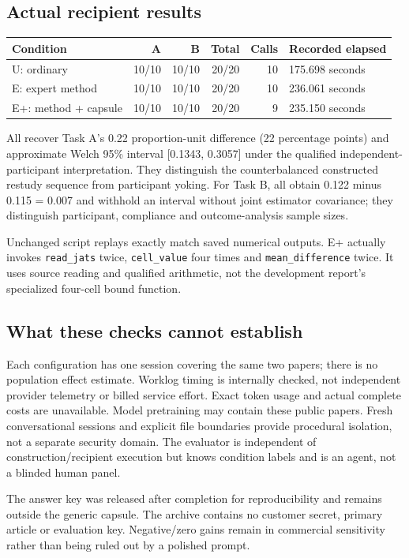 \documentclass[10pt]{article}
\begin{document}
\subsection*{Actual recipient results}

\begin{tabularx}{\textwidth}{lrrrrY}
\toprule Condition & A & B & Total & Calls & Recorded elapsed\\\midrule
U: ordinary &10/10 &10/10 &20/20 &10 &175.698 seconds\\
E: expert method &10/10 &10/10 &20/20 &10 &236.061 seconds\\
E+: method + capsule &10/10 &10/10 &20/20 &9 &235.150 seconds\\\bottomrule
\end{tabularx}

All recover Task A's 0.22 proportion-unit difference (22 percentage points) and approximate Welch 95\% interval [0.1343, 0.3057] under the qualified independent-participant interpretation. They distinguish the counterbalanced constructed restudy sequence from participant yoking. For Task B, all obtain 0.122 minus 0.115 = 0.007 and withhold an interval without joint estimator covariance; they distinguish participant, compliance and outcome-analysis sample sizes.

Unchanged script replays exactly match saved numerical outputs. E+ actually invokes \texttt{read\_jats} twice, \texttt{cell\_value} four times and \texttt{mean\_difference} twice. It uses source reading and qualified arithmetic, not the development report's specialized four-cell bound function.

\subsection*{What these checks cannot establish}

Each configuration has one session covering the same two papers; there is no population effect estimate. Worklog timing is internally checked, not independent provider telemetry or billed service effort. Exact token usage and actual complete costs are unavailable. Model pretraining may contain these public papers. Fresh conversational sessions and explicit file boundaries provide procedural isolation, not a separate security domain. The evaluator is independent of construction/recipient execution but knows condition labels and is an agent, not a blinded human panel.

The answer key was released after completion for reproducibility and remains outside the generic capsule. The archive contains no customer secret, primary article or evaluation key. Negative/zero gains remain in commercial sensitivity rather than being ruled out by a polished prompt.
\end{document}
